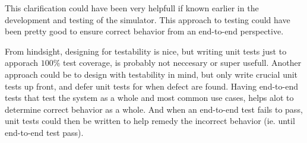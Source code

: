 This clarification could have been very helpfull if known earlier in the development and testing of the simulator. 
This approach to testing could have been pretty good to ensure correct behavior from an end-to-end perspective.

From hindsight, designing for testability is nice, but writing unit tests just to apporach $100\%$ test coverage, is probably not neccesary or super usefull.
Another approach could be to design with testability in mind, but only write crucial unit tests up front, and defer unit tests for when defect are found.
Having end-to-end tests that test the system as a whole and most common use cases, helps alot to determine correct behavior as a whole.
And when an end-to-end test fails to pass, unit tests could then be written to help remedy the incorrect behavior (ie. until end-to-end test pass).

\newpage